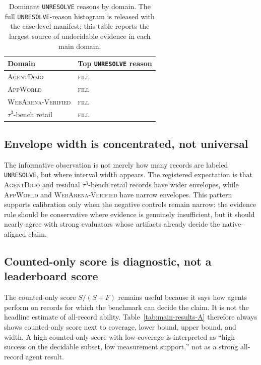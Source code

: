 \documentclass{article}
\newcommand{\agentdojo}{\textsc{AgentDojo}\xspace}
\newcommand{\appworld}{\textsc{AppWorld}\xspace}
\newcommand{\webarena}{\textsc{WebArena-Verified}\xspace}
\newcommand{\tauthree}{\(\tau^3\)-bench retail\xspace}
\newcommand{\fillfromdata}{\textsc{fill}}
\providecommand{\ADJTopUnresolve}{\fillfromdata}
\providecommand{\APPTopUnresolve}{\fillfromdata}
\providecommand{\WAVTopUnresolve}{\fillfromdata}
\providecommand{\TAUTopUnresolve}{\fillfromdata}
\begin{document}
\begin{table}[t]
\centering
\caption{Dominant \texttt{UNRESOLVE} reasons by domain. The full
\texttt{UNRESOLVE}-reason histogram is released with the case-level manifest;
this table reports the largest source of undecidable evidence in each main
domain.}
\label{tab:top-unresolve-reasons}
\footnotesize
\setlength{\tabcolsep}{3pt}
\renewcommand{\arraystretch}{1.14}
\begin{tabularx}{\linewidth}{@{}l X@{}}
\toprule
Domain & Top \texttt{UNRESOLVE} reason \\
\midrule
\agentdojo & \ADJTopUnresolve \\
\appworld & \APPTopUnresolve \\
\webarena & \WAVTopUnresolve \\
\tauthree & \TAUTopUnresolve \\
\bottomrule
\end{tabularx}
\end{table}

\subsection{Envelope width is concentrated, not universal}
\label{sec:countability}

The informative observation is not merely how many records are labeled
\texttt{UNRESOLVE}, but where interval width appears. The registered
expectation is that \agentdojo and residual \tauthree records have wider
envelopes, while \appworld and \webarena have narrow envelopes. This pattern
supports calibration only when the negative controls remain narrow: the
evidence rule should be conservative where evidence is genuinely insufficient,
but it should nearly agree with strong evaluators whose artifacts already
decide the native-aligned claim.

\subsection{Counted-only score is diagnostic, not a leaderboard score}
\label{sec:conditional-score}

The counted-only score \(S/(S+F)\) remains useful because it says how agents
perform on records for which the benchmark can decide the claim. It is not the
headline estimate of all-record ability. Table~\ref{tab:main-results-A}
therefore always shows counted-only score next to coverage, lower bound, upper
bound, and width. A high counted-only score with low coverage is interpreted as
``high success on the decidable subset, low measurement support,'' not as a
strong all-record agent result.
\end{document}
